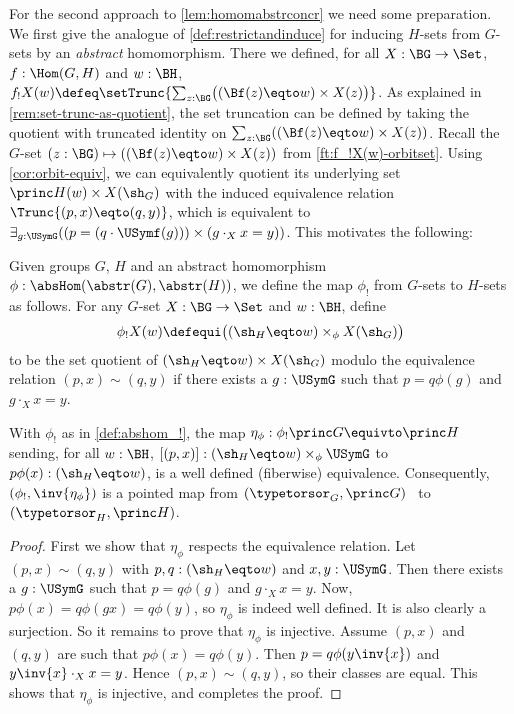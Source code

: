 \label{sec:absconctorsor}

For the second approach to \cref{lem:homomabstrconcr} we need
some preparation. We first give the analogue of
\cref{def:restrictandinduce} for inducing $H$-sets from
$G$-sets by an \emph{abstract} homomorphism. 
There we defined, for all $X:\BG\to\Set$, $f:\Hom(G,H)$ and $w:\BH$,
$f_!X(w)\defeq
\setTrunc{\sum_{z:\BG}\bigl((\Bf(z) \eqto w)\times X(z)\bigr)}$.
As explained in \cref{rem:set-trunc-as-quotient},
the set truncation can be defined by taking the quotient with
truncated identity on $\sum_{z:\BG}((\Bf(z) \eqto w)\times X(z))$.
Recall the $G$-set $(z:\BG)\mapsto((\Bf(z) \eqto w)\times X(z))$ 
from \cref{ft:f_!X(w)-orbitset}. Using \cref{cor:orbit-equiv},
we can equivalently quotient its underlying set 
$\princ H(w)\times X(\sh_G)$ with the induced equivalence 
relation $\Trunc{(p,x)\eqto(q,y)}$, 
which is equivalent to
$\exists_{g:\USymG}((p=(q\cdot\USymf(g)))\times(g\cdot_X x = y))$.
This motivates the following:

\begin{definition}\label{def:abshom_!}
  Given groups $G$, $H$ and an abstract homomorphism
  $\phi:\absHom(\abstr(G),\abstr(H))$, we define the map $\phi_!$
  from $G$-sets to $H$-sets as follows. 
  For any $G$-set $X:\BG\to\Set$ and $w:\BH$, define
  \[
    \phi_!X(w)\defequi \bigl((\sh_H \eqto w) \times_\phi X(\sh_G)\bigr)
  \]
  to be the set quotient of $(\sh_H\eqto w)\times X(\sh_G)$ modulo
  the equivalence relation $(p,x)\sim(q,y)$ if there exists a $g:\USymG$
  such that $p=q\phi(g)$ and $g\cdot_X x = y$.
\end{definition}

\begin{lemma}\label{lem:abshom_!}
  With $\phi_!$ as in \cref{def:abshom_!}, the map 
  $\eta_\phi:\phi_!\princ G \equivto \princ H$ sending, for all $w:\BH$,
  $[(p,x)]: (\sh_H \eqto w) \times_\phi \USymG$ to $p\phi(x):(\sh_H\eqto w)$,
  is a well defined (fiberwise) equivalence. Consequently,
  $(\phi_!,\inv{\eta_\phi})$ is a pointed map from
  $(\typetorsor_G,\princ G)$  to $(\typetorsor_H,\princ H)$.
\end{lemma}
\begin{proof}
First we show that $\eta_\phi$ respects the equivalence relation.
Let $(p,x)\sim(q,y)$ with $p,q:(\sh_H \eqto w)$ and $x,y:\USymG$.
Then there exists a $g:\USymG$ such that $p=q\phi(g)$ and $g\cdot_X x = y$.
Now, $p\phi(x)=q\phi(gx) = q\phi(y)$, so $\eta_\phi$
is indeed well defined.
It is also clearly a surjection. So it remains to prove that $\eta_\phi$
is injective. Assume $(p,x)$ and $(q,y)$ are such that
$p\phi(x) = q\phi(y)$. Then $p= q\phi(y\inv{x})$ and 
$y\inv{x}\cdot_X x = y$. 
Hence $(p,x)\sim(q,y)$, so their classes are equal.
This shows that $\eta_\phi$ is injective, and completes the proof.
\end{proof}

